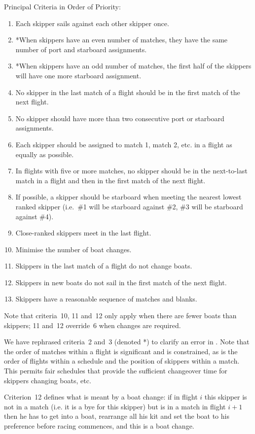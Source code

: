 \documentclass{llncs}
\begin{document}
\begin{framed}
\noindent Principal Criteria in Order of Priority:
\begin{enumerate}
\item Each skipper sails against each other skipper once.
\item *When skippers have an even number of matches, they have the same number of port and starboard
    assignments.
\item *When skippers have an odd number of matches, the first half of the skippers will have one
    more starboard assignment.
\item No skipper in the last match of a flight should be in the first match of the next flight.
\item No skipper should have more than two consecutive port or starboard assignments.
\item Each skipper should be assigned to match 1, match 2, etc. in a flight as equally as possible.
\item In flights with five or more matches, no skipper should be in the next-to-last match in a
    flight and then in the first match of the next flight.
\item If possible, a skipper should be starboard when meeting the nearest lowest ranked skipper
    (i.e.\ \#1 will be starboard against \#2, \#3 will be starboard against \#4).
\item Close-ranked skippers meet in the last flight.
\item Minimise the number of boat changes.
\item Skippers in the last match of a flight do not change boats.
\item Skippers in new boats do not sail in the first match of the next flight.
\item Skippers have a reasonable sequence of matches and blanks.
\end{enumerate}
Note that criteria~10, 11 and~12 only apply when there are fewer boats than skippers; 11 and~12
override~6 when changes are required.
\end{framed}

We have rephrased criteria~2 and~3 (denoted *) to clarify an error in \cite{isaf}. Note that the
order of matches within a flight is significant and is constrained, as is the order of flights
within a schedule and the position of skippers within a match. This permits fair schedules that
provide the sufficient changeover time for skippers changing boats, etc.

Criterion~12 defines what is meant by a boat change: if in flight $i$ this skipper is not in a match
(i.e. it is a bye for this skipper) but is in a match in flight $i+1$ then he has to get into a
boat, rearrange all his kit and set the boat to his preference before racing commences, and this is
a boat change.
\end{document}

